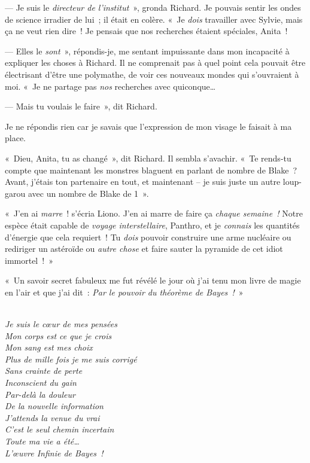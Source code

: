 --- Je suis le \emph{directeur de l'institut}~», gronda Richard. Je pouvais sentir les ondes de science irradier de lui~; il était en colère. «~Je \emph{dois} travailler avec Sylvie, mais ça ne veut rien dire~! Je pensais que nos recherches étaient spéciales, Anita~!

--- Elles le \emph{sont}~», répondis-je, me sentant impuissante dans mon incapacité à expliquer les choses à Richard. Il ne comprenait pas à quel point cela pouvait être électrisant d'être une polymathe, de voir ces nouveaux mondes qui s'ouvraient à moi. «~Je ne partage pas \emph{nos} recherches avec quiconque…

--- Mais tu voulais le faire~», dit Richard.

Je ne répondis rien car je savais que l'expression de mon visage le faisait à ma place.

«~Dieu, Anita, tu as changé~», dit Richard. Il sembla s'avachir. «~Te rends-tu compte que maintenant les monstres blaguent en parlant de nombre de Blake~? Avant, j'étais ton partenaire en tout, et maintenant -- je suis juste un autre loup-garou avec un nombre de Blake de 1~».


«~J'en ai \emph{marre}~! s'écria Liono. J'en ai marre de faire ça \emph{chaque semaine~!} Notre espèce était capable de \emph{voyage interstellaire}, Panthro, et je \emph{connais} les quantités d'énergie que cela requiert~! Tu \emph{dois} pouvoir construire une arme nucléaire ou rediriger un astéroïde ou \emph{autre chose} et faire sauter la pyramide de cet idiot immortel~!~»

\pagebreak[1]

«~Un savoir secret fabuleux me fut révélé le jour où j'ai tenu mon livre de magie en l'air et que j'ai dit~: \emph{Par le pouvoir du théorème de Bayes~!}~»

\pagebreak[1]

\emph{
\\
Je suis le cœur de mes pensées\\
Mon corps est ce que je crois\\
Mon sang est mes choix\\
Plus de mille fois je me suis corrigé\\
Sans crainte de perte\\
Inconscient du gain\\
Par-delà la douleur\\
De la nouvelle information\\
J'attends la venue du vrai\\
C'est le seul chemin incertain\\
Toute ma vie a été…\\
L'œuvre Infinie de Bayes~!
}

